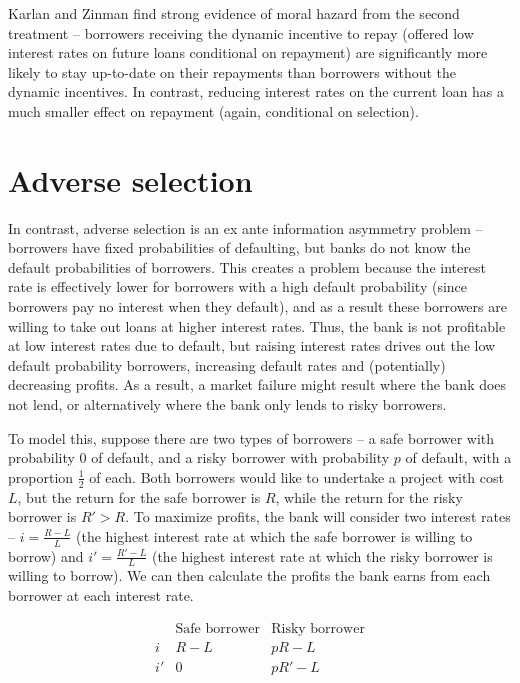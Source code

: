 \documentclass[12pt,english]{article}
\begin{document}
Karlan and Zinman find strong evidence of moral hazard from the second treatment -- borrowers receiving the dynamic incentive to repay (offered low interest rates on future loans conditional on repayment) are significantly more likely to stay up-to-date on their repayments than borrowers without the dynamic incentives. In contrast, reducing interest rates on the current loan has a much smaller effect on repayment (again, conditional on selection).

\section{Adverse selection}

In contrast, adverse selection is an ex ante information asymmetry problem -- borrowers have fixed probabilities of defaulting, but banks do not know the default probabilities of borrowers. This creates a problem because the interest rate is effectively lower for borrowers with a high default probability (since borrowers pay no interest when they default), and as a result these borrowers are willing to take out loans at higher interest rates. Thus, the bank is not profitable at low interest rates due to default, but raising interest rates drives out the low default probability borrowers, increasing default rates and (potentially) decreasing profits. As a result, a market failure might result where the bank does not lend, or alternatively where the bank only lends to risky borrowers.

To model this, suppose there are two types of borrowers -- a safe borrower with probability 0 of default, and a risky borrower with probability $p$ of default, with a proportion $\frac{1}{2}$ of each. Both borrowers would like to undertake a project with cost $L$, but the return for the safe borrower is $R$, while the return for the risky borrower is $R' > R$. To maximize profits, the bank will consider two interest rates -- $i = \frac{R - L}{L}$ (the highest interest rate at which the safe borrower is willing to borrow) and $i' = \frac{R' - L}{L}$ (the highest interest rate at which the risky borrower is willing to borrow). We can then calculate the profits the bank earns from each borrower at each interest rate.

$$
\begin{array}{c|c|c}
& \text{Safe borrower} & \text{Risky borrower} \\
\hline
i & R - L & pR - L \\
\hline
i' & 0 & pR' - L
\end{array}
$$
\end{document}
